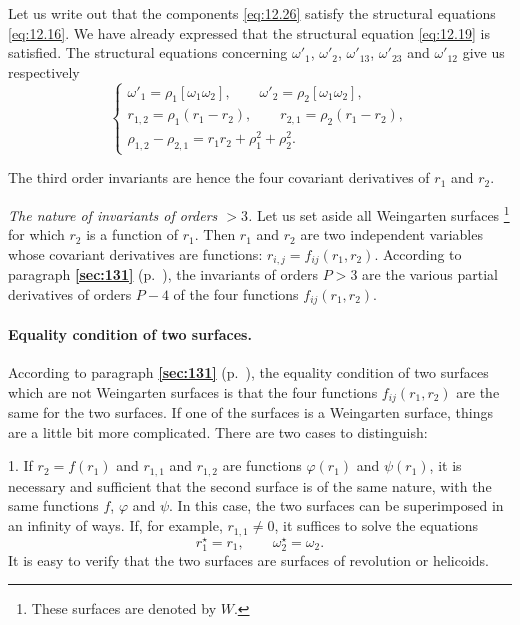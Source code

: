 \documentclass[leqno,11pt]{book}
\makeatletter
\numberwithin{equation}{chapter}
\theoremstyle{shape1}
\theoremstyle{shapesmall}
\let\old@phi\phi
\let\old@varphi\varphi
\let\phi\old@varphi
\let\varphi\old@phi
\newcommand{\fsref}[1]{{\rm\textsection\textbf{\ref{sec:#1}}}}
\newcommand{\str}{^{\star}}
\newcommand{\somespace}{\vspace{9pt}}
\makeatother
\begin{document}
Let us write out that the components \eqref{eq:12.26} satisfy the structural equations \eqref{eq:12.16}. We have already expressed that the structural equation \eqref{eq:12.19} is satisfied. The structural equations concerning $\omega'_{1}$, $\omega'_{2}$, $\omega'_{13}$, $\omega'_{23}$ and $\omega'_{12}$ give us respectively
\begin{equation}
  \label{eq:12.28}
  \left\{
    \begin{gathered}
      \omega'_{1}=\rho_{1}[\omega_{1}\omega_{2}],\qquad\omega'_{2}=\rho_{2}[\omega_{1}\omega_{2}],\\
      r_{1,2}=\rho_{1}(r_{1}-r_{2}),\qquad r_{2,1}=\rho_{2}(r_{1}-r_{2}),\\
      \rho_{1,2}-\rho_{2,1}=r_{1}r_{2}+\rho_{1}^{2}+\rho_{2}^{2}.
    \end{gathered}
  \right.
\end{equation}

The third order invariants are hence the four covariant derivatives of $r_{1}$ and $r_{2}$.

\somespace

\emph{The nature of invariants of orders $>3$.} Let us set aside all Weingarten surfaces \footnote{These surfaces are denoted by $W$.} for which $r_{2}$ is a function of $r_{1}$. Then $r_{1}$ and $r_{2}$ are two independent variables whose covariant derivatives are functions: $r_{i,j}=f_{ij}(r_{1},r_{2})$. According to paragraph \fsref{131} (p.~\pageref{sec:131}), the invariants of orders $P>3$ are the various partial derivatives of orders $P-4$ of the four functions $f_{ij}(r_{1},r_{2})$.

\paragraph{Equality condition of two surfaces.}
\label{sec:189}
According to paragraph \fsref{131} (p.~\pageref{sec:131}), the equality condition of two surfaces which are not Weingarten surfaces is that the four functions $f_{ij}(r_{1},r_{2})$ are the same for the two surfaces. If one of the surfaces is a Weingarten surface, things are a little bit more complicated. There are two cases to distinguish:

\somespace

1. If $r_{2}=f(r_{1})$ and $r_{1,1}$ and $r_{1,2}$ are functions $\phi(r_{1})$ and $\psi(r_{1})$, it is necessary and sufficient that the second surface is of the same nature, with the same functions $f$, $\phi$ and $\psi$. In this case, the two surfaces can be superimposed in an infinity of ways. If, for example, $r_{1,1}\neq 0$, it suffices to solve the equations
\[
r\str_{1}=r_{1},\qquad \omega\str_{2}=\omega_{2}.
\]
It is easy to verify that the two surfaces are surfaces of revolution or helicoids.
\end{document}
